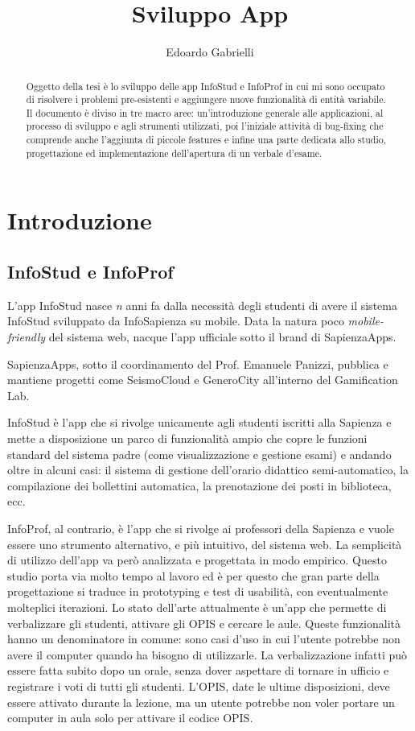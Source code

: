\documentclass[Lau, oneside]{sapthesis}%
\title{Sviluppo App}
\author{Edoardo Gabrielli}
\begin{document}
\frontmatter
\maketitle
\begin{abstract}
Oggetto della tesi è lo sviluppo delle app InfoStud e InfoProf in cui mi sono occupato di risolvere i problemi pre-esistenti e aggiungere nuove funzionalità di entità variabile. Il documento è diviso in tre macro aree: un'introduzione generale alle applicazioni, al processo di sviluppo e agli strumenti utilizzati, poi l'iniziale attività di bug-fixing che comprende anche l'aggiunta di piccole features e infine una parte dedicata allo studio, progettazione ed implementazione dell'apertura di un verbale d'esame.
\end{abstract}

\tableofcontents

\mainmatter
\chapter{Introduzione}
\label{ch:1}

\section{InfoStud e InfoProf}
\label{sec:pres}
L'app InfoStud nasce \textit{n} anni fa dalla necessità degli studenti di avere il sistema InfoStud sviluppato da InfoSapienza su mobile.
Data la natura poco \textit{mobile-friendly} del sistema web, nacque l'app ufficiale sotto il brand di SapienzaApps.

SapienzaApps, sotto il coordinamento del Prof. Emanuele Panizzi, pubblica e mantiene progetti come SeismoCloud e GeneroCity all'interno
del Gamification Lab.

InfoStud è l'app che si rivolge unicamente agli studenti iscritti alla Sapienza e mette a disposizione un parco di funzionalità ampio
che copre le funzioni standard del sistema padre (come visualizzazione e gestione esami) e andando oltre in alcuni casi: il sistema
di gestione dell'orario didattico semi-automatico, la compilazione dei bollettini automatica, la prenotazione dei posti in biblioteca, ecc.

InfoProf, al contrario, è l'app che si rivolge ai professori della Sapienza e vuole essere uno strumento alternativo, e più intuitivo, 
del sistema web. La semplicità di utilizzo dell'app va però analizzata e progettata in modo empirico. Questo studio porta via molto tempo 
al lavoro ed è per questo che gran parte della progettazione si traduce in prototyping e test di usabilità, con eventualmente molteplici
iterazioni. Lo stato dell'arte attualmente è un'app che permette di verbalizzare gli studenti, attivare gli OPIS e cercare le aule.
Queste funzionalità hanno un denominatore in comune: sono casi d'uso in cui l'utente potrebbe non avere il computer quando ha bisogno
di utilizzarle. La verbalizzazione infatti può essere fatta subito dopo un orale, senza dover aspettare di tornare in ufficio e 
registrare i voti di tutti gli studenti. L'OPIS, date le ultime disposizioni, deve essere attivato durante la lezione, ma un utente
potrebbe non voler portare un computer in aula solo per attivare il codice OPIS.
\end{document}
